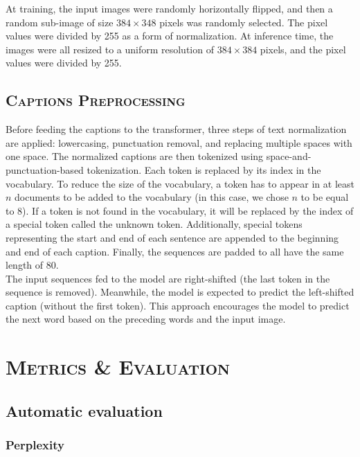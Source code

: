 \documentclass[a4paper,10pt]{article}
\begin{document}
\noindent At training, the input images were randomly horizontally flipped, and then a random sub-image of size $384 \times 348$ pixels was randomly selected. The pixel values were divided by 255 as a form of normalization. At inference time, the images were all resized to a uniform resolution of $384 \times 384$ pixels, and the pixel values were divided by 255.

\subsection{\scshape{Captions Preprocessing}}

\noindent Before feeding the captions to the transformer, three steps of text normalization are applied: lowercasing, punctuation removal, and replacing multiple spaces with one space. The normalized captions are then tokenized using space-and-punctuation-based tokenization. Each token is replaced by its index in the vocabulary. To reduce the size of the vocabulary, a token has to appear in at least $n$ documents to be added to the vocabulary (in this case, we chose $n$ to be equal to 8). If a token is not found in the vocabulary, it will be replaced by the index of a special token called the unknown token. Additionally, special tokens representing the start and end of each sentence are appended to the beginning and end of each caption. Finally, the sequences are padded to all have the same length of 80.\\

\noindent The input sequences fed to the model are right-shifted (the last token in the sequence is removed). Meanwhile, the model is expected to predict the left-shifted caption (without the first token). This approach encourages the model to predict the next word based on the preceding words and the input image.

\section{\scshape{Metrics \& Evaluation}}

\subsection{Automatic evaluation}

\subsubsection{Perplexity}
\end{document}
